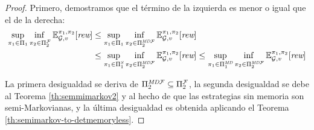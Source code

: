 \begin{proof}
	Primero, demostramos que el término de la izquierda es menor o igual que el de la derecha:
\begin{align*}
  \adjustlimits \sup_{\strat{1} \in \Strategies{1}} \inf_{\strat{2} \in \FairStrats{2}} \Expect{\strat{1}}{\strat{2}}_{\StochG,v}[\Rewards]
  &{} \leq  \adjustlimits \sup_{\strat{1} \in \Strategies{1}} \inf_{\strat{2} \in \DetMemorylessFairStrats{2}} \Expect{\strat{1}}{\strat{2}}_{\StochG,v}[\Rewards]\\
  &{} \leq \adjustlimits  \sup_{\strat{1} \in \SemiMarkovStrats{1}} \inf_{\strat{2} \in \DetMemorylessFairStrats{2}} \Expect{\strat{1}}{\strat{2}}_{\StochG,v}[\Rewards]
  \leq \adjustlimits \sup_{\strat{1} \in \DetMemorylessStrats{1}} \inf_{\strat{2} \in \DetMemorylessFairStrats{2}} \Expect{\strat{1}}{\strat{2}}_{\StochG,v}[\Rewards]
\end{align*}

La primera desigualdad se deriva de $\Pi^{\textit{MD}\mathcal{F}}_{2} \subseteq \Pi^{\mathcal{F}}_{2}$, la segunda desigualdad se debe al Teorema \ref{th:semmimarkov2} y al hecho de que las estrategias sin memoria son semi-Markovianas, y la última desigualdad es obtenida aplicando el Teorema \ref{th:semimarkov-to-detmemoryless}.


\end{proof}
